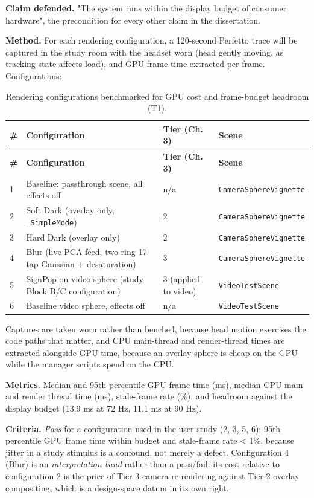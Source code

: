 \textbf{Claim defended.} "The system runs within the display budget of consumer hardware", the
precondition for every other claim in the dissertation.

\textbf{Method.} For each rendering configuration, a 120-second Perfetto trace will be captured in the
study room with the headset worn (head gently moving, as tracking state affects load), and GPU
frame time extracted per frame. Configurations:

\begin{longtable}{p{}|p{}|p{}|p{}}
\caption{Rendering configurations benchmarked for GPU cost and frame-budget headroom (T1).}\\
\hline
\textbf{\#} & \textbf{Configuration} & \textbf{Tier (Ch. 3)} & \textbf{Scene} \\
\hline
\endfirsthead
\hline
\textbf{\#} & \textbf{Configuration} & \textbf{Tier (Ch. 3)} & \textbf{Scene} \\
\hline
\endhead
\hline
1 & Baseline: passthrough scene, all effects off & n/a & \verb|CameraSphereVignette| \\
2 & Soft Dark (overlay only, \verb|_SimpleMode|) & 2 & \verb|CameraSphereVignette| \\
3 & Hard Dark (overlay only) & 2 & \verb|CameraSphereVignette| \\
4 & Blur (live PCA feed, two-ring 17-tap Gaussian + desaturation) & 3 & \verb|CameraSphereVignette| \\
5 & SignPop on video sphere (study Block B/C configuration) & 3 (applied to video) & \verb|VideoTestScene| \\
6 & Baseline video sphere, effects off & n/a & \verb|VideoTestScene| \\
\hline
\end{longtable}

Captures are taken worn rather than benched, because head motion exercises the code paths that
matter, and CPU main-thread and render-thread times are extracted alongside GPU time, because an
overlay sphere is cheap on the GPU while the manager scripts spend on the CPU.

\textbf{Metrics.} Median and 95th-percentile GPU frame time (ms), median CPU main and render thread
time (ms), stale-frame rate (\%), and headroom against the display budget (13.9 ms at 72 Hz, 11.1 ms
at 90 Hz).

\textbf{Criteria.} \textit{Pass} for a configuration used in the user study (2, 3, 5, 6): 95th-percentile GPU
frame time within budget and stale-frame rate < 1\%, because jitter in a study stimulus is a
confound, not merely a defect. Configuration 4 (Blur) is an \textit{interpretation band} rather than a
pass/fail: its cost relative to configuration 2 is the price of Tier-3 camera re-rendering against
Tier-2 overlay compositing, which is a design-space datum in its own right.

